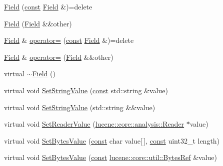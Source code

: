 \begin{DoxyCompactItemize}
\item 
\mbox{\hyperlink{classlucene_1_1core_1_1document_1_1Field_a9759aeef777d122b3a14ea237b9996df}{Field}} (\mbox{\hyperlink{ZlibCrc32_8h_a2c212835823e3c54a8ab6d95c652660e}{const}} \mbox{\hyperlink{classlucene_1_1core_1_1document_1_1Field}{Field}} \&)=delete
\item 
\mbox{\hyperlink{classlucene_1_1core_1_1document_1_1Field_a84c8c8edfd1576cdc1adcf6f3c38b57f}{Field}} (\mbox{\hyperlink{classlucene_1_1core_1_1document_1_1Field}{Field}} \&\&other)
\item 
\mbox{\hyperlink{classlucene_1_1core_1_1document_1_1Field}{Field}} \& \mbox{\hyperlink{classlucene_1_1core_1_1document_1_1Field_a9a165fa3cc612d355b6f3ef5deb87d50}{operator=}} (\mbox{\hyperlink{ZlibCrc32_8h_a2c212835823e3c54a8ab6d95c652660e}{const}} \mbox{\hyperlink{classlucene_1_1core_1_1document_1_1Field}{Field}} \&)=delete
\item 
\mbox{\hyperlink{classlucene_1_1core_1_1document_1_1Field}{Field}} \& \mbox{\hyperlink{classlucene_1_1core_1_1document_1_1Field_ac2fbc0a1ae50f0e7452b90687aa0be78}{operator=}} (\mbox{\hyperlink{classlucene_1_1core_1_1document_1_1Field}{Field}} \&\&other)
\item 
virtual \mbox{\hyperlink{classlucene_1_1core_1_1document_1_1Field_aafea12de720890e69c15dbd033331391}{$\sim$\+Field}} ()
\item 
virtual void \mbox{\hyperlink{classlucene_1_1core_1_1document_1_1Field_aa649cff34208abbbe274c5112d60712d}{Set\+String\+Value}} (\mbox{\hyperlink{ZlibCrc32_8h_a2c212835823e3c54a8ab6d95c652660e}{const}} std\+::string \&value)
\item 
virtual void \mbox{\hyperlink{classlucene_1_1core_1_1document_1_1Field_af2b792611d8666daf647adac0ed1a0ed}{Set\+String\+Value}} (std\+::string \&\&value)
\item 
virtual void \mbox{\hyperlink{classlucene_1_1core_1_1document_1_1Field_a86a255eb3b09b70fe76af3b7d75364e5}{Set\+Reader\+Value}} (\mbox{\hyperlink{classlucene_1_1core_1_1analysis_1_1Reader}{lucene\+::core\+::analysis\+::\+Reader}} $\ast$value)
\item 
virtual void \mbox{\hyperlink{classlucene_1_1core_1_1document_1_1Field_ab9214d49b8e3c8692820ad4f3086e6dc}{Set\+Bytes\+Value}} (\mbox{\hyperlink{ZlibCrc32_8h_a2c212835823e3c54a8ab6d95c652660e}{const}} char value\mbox{[}$\,$\mbox{]}, \mbox{\hyperlink{ZlibCrc32_8h_a2c212835823e3c54a8ab6d95c652660e}{const}} uint32\+\_\+t length)
\item 
virtual void \mbox{\hyperlink{classlucene_1_1core_1_1document_1_1Field_a41d077e63ce6fae8677b8df6b29821bd}{Set\+Bytes\+Value}} (\mbox{\hyperlink{ZlibCrc32_8h_a2c212835823e3c54a8ab6d95c652660e}{const}} \mbox{\hyperlink{classlucene_1_1core_1_1util_1_1BytesRef}{lucene\+::core\+::util\+::\+Bytes\+Ref}} \&value)

\end{DoxyCompactItemize}
